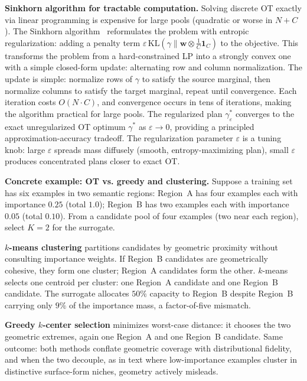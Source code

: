\begin{foldable}
  \textbf{Sinkhorn algorithm for tractable computation.}
  Solving discrete \ac{OT} exactly via linear programming is expensive for large pools (quadratic or worse in $N + C$).
  The Sinkhorn algorithm~\cite{cuturi2013sinkhorn} reformulates the problem with entropic regularization: adding a penalty term $\varepsilon \, \text{KL}(\gamma \| \mathbf{w} \otimes \tfrac{1}{C}\mathbf{1}_C)$ to the objective.
  This transforms the problem from a hard-constrained LP into a strongly convex one with a simple closed-form update: alternating row and column normalization.
  The update is simple: normalize rows of $\gamma$ to satisfy the source marginal, then normalize columns to satisfy the target marginal, repeat until convergence.
  Each iteration costs $O(N \cdot C)$, and convergence occurs in tens of iterations, making the algorithm practical for large pools.
  The regularized plan $\gamma_\varepsilon^*$ converges to the exact unregularized \ac{OT} optimum $\gamma^*$ as $\varepsilon \to 0$, providing a principled approximation-accuracy tradeoff.
  The regularization parameter $\varepsilon$ is a tuning knob: large $\varepsilon$ spreads mass diffusely (smooth, entropy-maximizing plan), small $\varepsilon$ produces concentrated plans closer to exact \ac{OT}.
\end{foldable}

\begin{foldable}
  \textbf{Concrete example: \ac{OT} vs. greedy and clustering.}
  Suppose a training set has six examples in two semantic regions: Region~A has four examples each with importance $0.25$ (total $1.0$); Region~B has two examples each with importance $0.05$ (total $0.10$).
  From a candidate pool of four examples (two near each region), select $K=2$ for the surrogate.
\end{foldable}

\begin{foldable}
  \textbf{$k$-means clustering} partitions candidates by geometric proximity without consulting importance weights.
  If Region~B candidates are geometrically cohesive, they form one cluster; Region~A candidates form the other.
  $k$-means selects one centroid per cluster: one Region~A candidate and one Region~B candidate.
  The surrogate allocates $50\%$ capacity to Region~B despite Region~B carrying only $9\%$ of the importance mass, a factor-of-five mismatch.
\end{foldable}

\begin{foldable}
  \textbf{Greedy $k$-center selection} minimizes worst-case distance: it chooses the two geometric extremes, again one Region~A and one Region~B candidate.
  Same outcome: both methods conflate geometric coverage with distributional fidelity, and when the two decouple, as in text where low-importance examples cluster in distinctive surface-form niches, geometry actively misleads.
\end{foldable}

